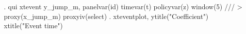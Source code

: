 . qui xtevent y_jump_m, panelvar(id) timevar(t) policyvar(z) window(5) ///
>         proxy(x_jump_m) proxyiv(select)
{\smallskip}
. xteventplot, ytitle("Coefficient") xtitle("Event time")
